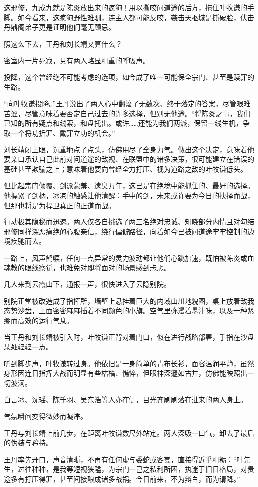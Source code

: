 这邪修，九成九就是陈炎放出来的疯狗！用以撕咬问道途的后方，拖住叶牧谦的手脚。如今看来，这疯狗野性难驯，连主人都可能反咬，袭击天枢城是撕破脸，伏击丹鼎阁弟子更是证明他们毫无顾忌。

照这么下去，王丹和刘长靖又算什么？

密室内一片死寂，只有两人略显粗重的呼吸声。

投降，这个曾经绝不可能考虑的选项，如今成了唯一可能保全宗门、甚至是赎罪的生路。

“向叶牧谦投降。”王丹说出了两人心中翻滚了无数次、终于落定的答案，尽管艰难苦涩，尽管意味着要否定自己过去的许多选择，但别无他途。“将陈炎之事，我们已知的所有疑点和线索，和盘托出。或许……还能为我们两派，保留一线生机，争取一个将功折罪、戴罪立功的机会。”

刘长靖闭上眼，沉重地点了点头，仿佛用尽了全身力气。做出这个决定，意味着他要亲口承认自己此前对问道途的敌视、在联盟中的诸多决策，很可能建立在错误的基础甚至欺骗之上；意味着他要向曾经全力打压、视为道路之敌的叶牧谦低头。

但比起宗门倾覆、剑派蒙羞、遗臭万年，这已是在绝境中能抓住的、最好的选择。他握紧了剑柄，冰凉的触感让他清醒：手中的剑，未来或许要为今日的抉择而战，但那也将是为捍卫真正的正道而战。

行动极其隐秘而迅速。两人仅各自挑选了两三名绝对忠诚、知晓部分内情且对勾结邪修同样深恶痛绝的心腹亲信，绕行偏僻路径，向着如今已被问道途牢牢控制的边境疾驰而去。

一路上，风声鹤唳，任何一点异常的灵力波动都让他们心跳加速，既怕被陈炎或血魂教的眼线察觉，也难免对即将面对的场景感到忐忑。

几人来到云霞山下，通报一声，很快进入了云隐别院。

别院正堂被改造成了指挥所，墙壁上悬挂着巨大的内域山川地貌图，桌上放着敌我态势沙盘，上面密密麻麻插着不同颜色的小旗。空气里弥漫着墨汁味，以及一种紧绷而高效的运行气息。

当王丹和刘长靖被引入时，叶牧谦正背对着门口，似在进行战略部署，手指在沙盘某处轻轻一点。

听到脚步声，叶牧谦转过身。他依旧是一身简单的青布长衫，面容温润平静，虽然身形因连日指挥大战而明显有些枯槁、憔悴，但眼神深邃如古井，仿佛能映照出一切波澜。

白言冰、沈瑶、陈千羽、吴东浩等人亦在侧，目光齐刷刷落在进来的两人身上。

气氛瞬间变得微妙而凝滞。

王丹与刘长靖上前几步，在距离叶牧谦数尺外站定。两人深吸一口气，卸去了最后的伪装与矜持。

王丹率先开口，声音清晰，不再有任何虚与委蛇或客套，直接得近乎粗粝：“叶先生，过往种种，是我等短视狭隘，为宗门一己之私利所困，执迷于旧日格局，对贵途多有打压得罪，甚至间接酿成诸多战祸。今日前来，不为辩白，而为请降。”


